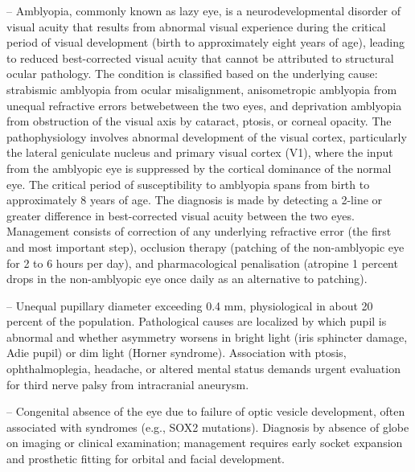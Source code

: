 -- Amblyopia, commonly known as lazy eye, is a neurodevelopmental disorder of visual acuity that results from abnormal visual experience during the critical period of visual development (birth to approximately eight years of age), leading to reduced best-corrected visual acuity that cannot be attributed to structural ocular pathology. The condition is classified based on the underlying cause: strabismic amblyopia from ocular misalignment, anisometropic amblyopia from unequal refractive errors betwebetween the two eyes, and deprivation amblyopia from obstruction of the visual axis by cataract, ptosis, or corneal opacity. The pathophysiology involves abnormal development of the visual cortex, particularly the lateral geniculate nucleus and primary visual cortex (V1), where the input from the amblyopic eye is suppressed by the cortical dominance of the normal eye. The critical period of susceptibility to amblyopia spans from birth to approximately 8 years of age. The diagnosis is made by detecting a 2-line or greater difference in best-corrected visual acuity between the two eyes. Management consists of correction of any underlying refractive error (the first and most important step), occlusion therapy (patching of the non-amblyopic eye for 2 to 6 hours per day), and pharmacological penalisation (atropine 1 percent drops in the non-amblyopic eye once daily as an alternative to patching).

-- Unequal pupillary diameter exceeding 0.4 mm, physiological in about 20 percent of the population. Pathological causes are localized by which pupil is abnormal and whether asymmetry worsens in bright light (iris sphincter damage, Adie pupil) or dim light (Horner syndrome). Association with ptosis, ophthalmoplegia, headache, or altered mental status demands urgent evaluation for third nerve palsy from intracranial aneurysm.

-- Congenital absence of the eye due to failure of optic vesicle development, often associated with syndromes (e.g., SOX2 mutations). Diagnosis by absence of globe on imaging or clinical examination; management requires early socket expansion and prosthetic fitting for orbital and facial development.

